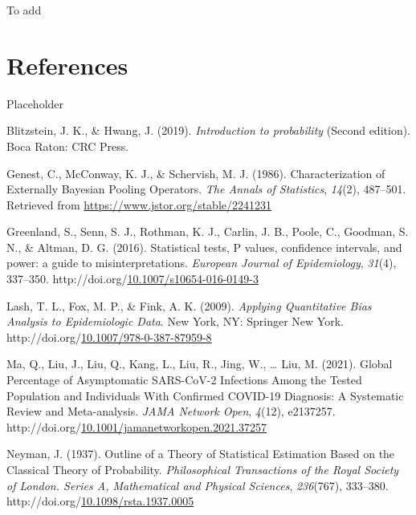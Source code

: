 \documentclass[12pt,twoside]{smiththesis}
\newlength{\cslhangindent}
\newenvironment{CSLReferences}[2] %
 {%
\setlength{\parindent}{0pt}
\ifodd #1 \everypar{\setlength{\hangindent}{\cslhangindent}}\ignorespaces\fi
\ifnum #2 > 0
\setlength{\parskip}{#2\baselineskip}
  \fi
}%
{}
\begin{document}
To add

\hypertarget{references}{%
\chapter*{References}\label{references}}

Placeholder

\hypertarget{refs}{}
\begin{CSLReferences}{1}{0}
\leavevmode{}%
Blitzstein, J. K., \& Hwang, J. (2019). \emph{Introduction to probability} (Second edition). Boca Raton: CRC Press.

\leavevmode{}%
Genest, C., McConway, K. J., \& Schervish, M. J. (1986). Characterization of Externally Bayesian Pooling Operators. \emph{The Annals of Statistics}, \emph{14}(2), 487--501. Retrieved from \url{https://www.jstor.org/stable/2241231}

\leavevmode{}%
Greenland, S., Senn, S. J., Rothman, K. J., Carlin, J. B., Poole, C., Goodman, S. N., \& Altman, D. G. (2016). Statistical tests, P values, confidence intervals, and power: a guide to misinterpretations. \emph{European Journal of Epidemiology}, \emph{31}(4), 337--350. http://doi.org/\href{https://doi.org/10.1007/s10654-016-0149-3}{10.1007/s10654-016-0149-3}

\leavevmode{}%
Lash, T. L., Fox, M. P., \& Fink, A. K. (2009). \emph{Applying Quantitative Bias Analysis to Epidemiologic Data}. New York, NY: Springer New York. http://doi.org/\href{https://doi.org/10.1007/978-0-387-87959-8}{10.1007/978-0-387-87959-8}

\leavevmode{}%
Ma, Q., Liu, J., Liu, Q., Kang, L., Liu, R., Jing, W., \ldots{} Liu, M. (2021). Global Percentage of Asymptomatic SARS-CoV-2 Infections Among the Tested Population and Individuals With Confirmed COVID-19 Diagnosis: A Systematic Review and Meta-analysis. \emph{JAMA Network Open}, \emph{4}(12), e2137257. http://doi.org/\href{https://doi.org/10.1001/jamanetworkopen.2021.37257}{10.1001/jamanetworkopen.2021.37257}

\leavevmode{}%
Neyman, J. (1937). Outline of a Theory of Statistical Estimation Based on the Classical Theory of Probability. \emph{Philosophical Transactions of the Royal Society of London. Series A, Mathematical and Physical Sciences}, \emph{236}(767), 333--380. http://doi.org/\href{https://doi.org/10.1098/rsta.1937.0005}{10.1098/rsta.1937.0005}


\end{CSLReferences}
\end{document}
